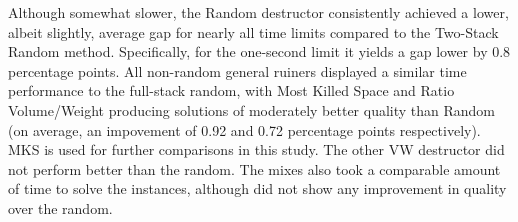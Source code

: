 \documentclass[preprint,11pt,3p]{elsarticle}
\begin{document}
Although somewhat slower, the Random destructor consistently achieved a lower, albeit slightly, average gap for nearly all time limits compared to the Two-Stack Random method. Specifically, for the one-second limit it yields a gap lower by 0.8 percentage points. All non-random general ruiners displayed a similar time performance to the full-stack random, with Most Killed Space and Ratio Volume/Weight producing solutions of moderately better quality than Random (on average, an impovement of 0.92 and 0.72 percentage points respectively). MKS is used for further comparisons in this study. The other VW destructor did not perform better than the random. The mixes also took a comparable amount of time to solve the instances, although did not show any improvement in quality over the random.

\begin{table}[ht]
\centering
{}
\end{table}
\end{document}
